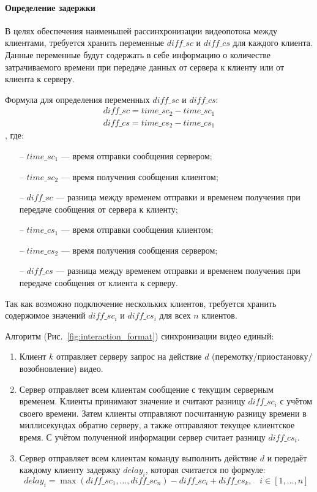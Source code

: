 \documentclass{../includes/TechDoc}
\begin{document}
    \paragraph{Определение задержки}

    В целях обеспечения наименьшей рассинхронизации видеопотока между клиентами, требуется хранить переменные \(diff\_sc\) и \(diff\_cs\) для
    каждого клиента.
    Данные переменные будут содержать в себе информацию о количестве затрачиваемого времени при передаче данных от сервера к клиенту или от клиента к серверу.

    Формула для определения переменных \(diff\_sc\) и \(diff\_cs\): \begin{gather*}
                                                                        diff\_sc = time\_sc_2 - time\_sc_1\\
                                                                        diff\_cs = time\_cs_2 - time\_cs_1
    \end{gather*}, где:
    \begin{itemize}[noitemsep]
        \item[--] \(time\_sc_1\) — время отправки сообщения сервером;
        \item[--] \(time\_sc_2\) — время получения сообщения клиентом;
        \item[--] \(diff\_sc\) — разница между временем отправки и временем получения при передаче сообщения от сервера к клиенту;
        \item[--] \(time\_cs_1\) — время отправки сообщения клиентом;
        \item[--] \(time\_cs_2\) — время получения сообщения сервером;
        \item[--] \(diff\_cs\) — разница между временем отправки и временем получения при передаче сообщения от клиента к серверу.
    \end{itemize}

    Так как возможно подключение нескольких клиентов, требуется хранить содержимое значений \(diff\_sc_i\) и \(diff\_cs_i\) для всех \(n\) клиентов.

    Алгоритм (Рис.~\ref{fig:interaction_format}) синхронизации видео единый:
    \begin{enumerate}
        \item Клиент \(k\) отправляет серверу запрос на действие \(d\) (перемотку/приостановку/возобновление) видео.
        \item Сервер отправляет всем клиентам сообщение с текущим серверным временем.
        Клиенты принимают значение и считают разницу \(diff\_sc_i\) с учётом своего времени.
        Затем клиенты отправляют посчитанную разницу времени в миллисекундах обратно серверу, а также отправляют текущее клиентское время.
        С учётом полученной информации сервер считает разницу \(diff\_cs_i\).
        \item Сервер отправляет всем клиентам команду выполнить действие \(d\) и передаёт каждому клиенту задержку \(delay_i\),
        которая считается по формуле: \[ delay_i = \max(diff\_sc_1, \ldots, diff\_sc_n) - diff\_sc_i + diff\_cs_k, \;\;\; i \in [1, \ldots, n] \]
    \end{enumerate}
\end{document}
